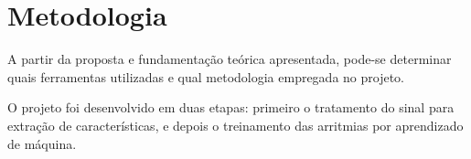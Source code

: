 \documentclass[conference]{IEEEtran}
\begin{document}


%
%




\section{Metodologia}

A partir da proposta e fundamentação teórica apresentada, pode-se determinar quais ferramentas utilizadas e qual metodologia empregada no projeto. 

O projeto foi desenvolvido em duas etapas: primeiro o tratamento do sinal para extração de características, e depois o treinamento das arritmias por aprendizado de máquina.
\end{document}
